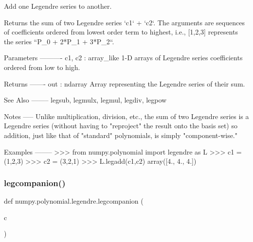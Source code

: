 \begin{DoxyVerb}Add one Legendre series to another.

Returns the sum of two Legendre series `c1` + `c2`.  The arguments
are sequences of coefficients ordered from lowest order term to
highest, i.e., [1,2,3] represents the series ``P_0 + 2*P_1 + 3*P_2``.

Parameters
----------
c1, c2 : array_like
    1-D arrays of Legendre series coefficients ordered from low to
    high.

Returns
-------
out : ndarray
    Array representing the Legendre series of their sum.

See Also
--------
legsub, legmulx, legmul, legdiv, legpow

Notes
-----
Unlike multiplication, division, etc., the sum of two Legendre series
is a Legendre series (without having to "reproject" the result onto
the basis set) so addition, just like that of "standard" polynomials,
is simply "component-wise."

Examples
--------
>>> from numpy.polynomial import legendre as L
>>> c1 = (1,2,3)
>>> c2 = (3,2,1)
>>> L.legadd(c1,c2)
array([4.,  4.,  4.])\end{DoxyVerb}
 \mbox{\label{namespacenumpy_1_1polynomial_1_1legendre_a0238e400566b21d3aabc8fcbf75be125}} 
\subsubsection{\texorpdfstring{legcompanion()}{legcompanion()}}
{\footnotesize\ttfamily def numpy.\+polynomial.\+legendre.\+legcompanion (\begin{DoxyParamCaption}\item[{}]{c }\end{DoxyParamCaption})}

